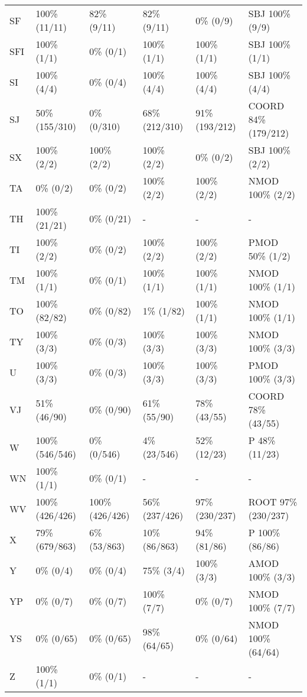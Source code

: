 \begin{small}
\begin{longtable}{|l|l|l|l|l|l|}
SF & 100\% (11/11) & 82\% (9/11) & 82\% (9/11) & 0\% (0/9) & SBJ 100\% (9/9) \\ 
SFI & 100\% (1/1) & 0\% (0/1) & 100\% (1/1) & 100\% (1/1) & SBJ 100\% (1/1) \\ 
SI & 100\% (4/4) & 0\% (0/4) & 100\% (4/4) & 100\% (4/4) & SBJ 100\% (4/4) \\ 
SJ & 50\% (155/310) & 0\% (0/310) & 68\% (212/310) & 91\% (193/212) & COORD 84\% (179/212) \\ 
SX & 100\% (2/2) & 100\% (2/2) & 100\% (2/2) & 0\% (0/2) & SBJ 100\% (2/2) \\ 
TA & 0\% (0/2) & 0\% (0/2) & 100\% (2/2) & 100\% (2/2) & NMOD 100\% (2/2) \\ 
TH & 100\% (21/21) & 0\% (0/21) & - & - & - \\ 
TI & 100\% (2/2) & 0\% (0/2) & 100\% (2/2) & 100\% (2/2) & PMOD 50\% (1/2) \\ 
TM & 100\% (1/1) & 0\% (0/1) & 100\% (1/1) & 100\% (1/1) & NMOD 100\% (1/1) \\ 
TO & 100\% (82/82) & 0\% (0/82) & 1\% (1/82) & 100\% (1/1) & NMOD 100\% (1/1) \\ 
TY & 100\% (3/3) & 0\% (0/3) & 100\% (3/3) & 100\% (3/3) & NMOD 100\% (3/3) \\ 
U & 100\% (3/3) & 0\% (0/3) & 100\% (3/3) & 100\% (3/3) & PMOD 100\% (3/3) \\ 
VJ & 51\% (46/90) & 0\% (0/90) & 61\% (55/90) & 78\% (43/55) & COORD 78\% (43/55) \\ 
W & 100\% (546/546) & 0\% (0/546) & 4\% (23/546) & 52\% (12/23) & P 48\% (11/23) \\ 
WN & 100\% (1/1) & 0\% (0/1) & - & - & - \\ 
WV & 100\% (426/426) & 100\% (426/426) & 56\% (237/426) & 97\% (230/237) & ROOT 97\% (230/237) \\ 
X & 79\% (679/863) & 6\% (53/863) & 10\% (86/863) & 94\% (81/86) & P 100\% (86/86) \\ 
Y & 0\% (0/4) & 0\% (0/4) & 75\% (3/4) & 100\% (3/3) & AMOD 100\% (3/3) \\ 
YP & 0\% (0/7) & 0\% (0/7) & 100\% (7/7) & 0\% (0/7) & NMOD 100\% (7/7) \\ 
YS & 0\% (0/65) & 0\% (0/65) & 98\% (64/65) & 0\% (0/64) & NMOD 100\% (64/64) \\ 
Z & 100\% (1/1) & 0\% (0/1) & - & - & - \\ 
\end{longtable}
\end{small}

